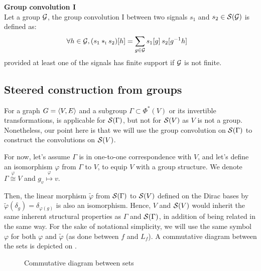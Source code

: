 \begin{definition}\textbf{Group convolution I}\\
Let a group $\mathcal{G}$, the group convolution I between two signals $s_1$ and $s_2 \in \mathcal{S}(\mathcal{G})$ is defined as:
\begin{align*}
\forall h \in \group, (s_1 \ast_{\I} s_2)[h] & = \displaystyle \sum_{g \in \group} s_1[g] \h{2} s_2[g^{-1}h]%
\end{align*}
provided at least one of the signals has finite support if $\mathcal{G}$ is not finite.
\label{def:conv1}
\end{definition}

\subsection{Steered construction from groups}

For a graph $G = \langle V, E \rangle$ and a subgroup $\Gamma \subset \Phi^*(V)$ or its invertible transformations,  is applicable for $\mathcal{S}(\Gamma)$, but not for $\mathcal{S}(V)$ as $V$ is not a group. Nonetheless, our point here is that we will use the group convolution on $\mathcal{S}(\Gamma)$ to construct the convolutions on $\mathcal{S}(V)$.

For now, let's assume $\Gamma$ is in one-to-one correspondence with $V$, and let's define an isomorphism $\varphi$ from $\Gamma$ to $V$, to equip $V$ with a group structure. We denote $\Gamma \overset{\varphi}{\cong} V$ and $g_v \overset{\varphi}\mapsto v$.

Then, the linear morphism $\widetilde\varphi$ from $\mathcal{S}(\Gamma)$ to $\mathcal{S}(V)$ defined on the Dirac bases by $\widetilde\varphi(\delta_g) = \delta_{\varphi(g)}$ is also an isomorphism. Hence, $V$ and $\mathcal{S}(V)$ would inherit the same inherent structural properties as $\Gamma$ and $\mathcal{S}(\Gamma)$, in addition of being related in the same way. For the sake of notational simplicity, we will use the same symbol $\varphi$ for both $\varphi$ and $\widetilde\varphi$ (as done between $f$ and $L_f$). A commutative diagram between the sets is depicted on .

\begin{figure}[H]
\centering
{}%
\caption{Commutative diagram between sets}
\label{fig:iso}
\end{figure}

